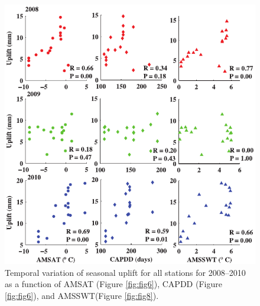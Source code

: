 \clearpage
\begin{figure}
 \centering
 \includegraphics{figs_chpt3/2012GC004432-p13.pdf} 
 \caption{Temporal variation of seasonal uplift for all stations for 2008–2010 as a function of AMSAT
(Figure \ref{fig:fig6}), CAPDD (Figure \ref{fig:fig6}), and AMSSWT(Figure \ref{fig:fig8}).}
 \label{fig:fig13}
\end{figure}

